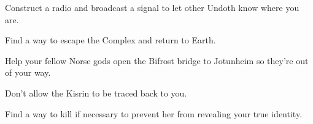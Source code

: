 \documentclass[char]{guardians}
\begin{document}














\begin{itemz}[Goals]
  \item Construct a radio and broadcast a signal to let other Undoth know where you are.
  \item Find a way to escape the Complex and return to Earth.
  \item Help your fellow Norse gods open the Bifrost bridge to Jotunheim so they're out of your way.
  \item Don't allow the Kisrin to be traced back to you.
  \item Find a way to kill \cAmaterasu{} if necessary to prevent her from revealing your true identity.
\end{itemz}
\end{document}
